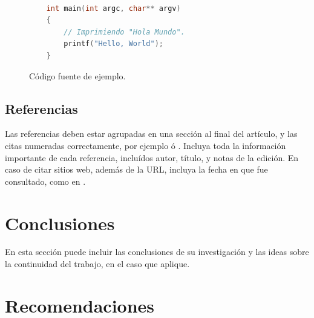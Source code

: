 \documentclass[a4paper,10pt]{article}
\begin{document}

		\begin{figure}[htb]%
			\begin{lstlisting}[language=c]%

    int main(int argc, char** argv)
    {
        // Imprimiendo "Hola Mundo".
        printf("Hello, World");
    }

			\end{lstlisting}
		\caption{Código fuente de ejemplo.\label{fig:code}}
		\end{figure}

	\subsection{Referencias}
  	Las referencias deben estar agrupadas en una sección al final del artículo,
  	y las citas numeradas correctamente, por ejemplo \cite{knuth} ó \cite{goedel}.
  	Incluya toda la información importante de cada referencia, incluídos autor,
  	título, y notas de la edición. En caso de citar sitios web, además
  	de la URL, incluya la fecha en que fue consultado, como en \cite{wiki}.




\section{Conclusiones}\label{sec:conc}

  En esta sección puede incluir las conclusiones de su investigación y las ideas
  sobre la continuidad del trabajo, en el caso que aplique.




\section{Recomendaciones}\label{sec:rec}
\end{document}
